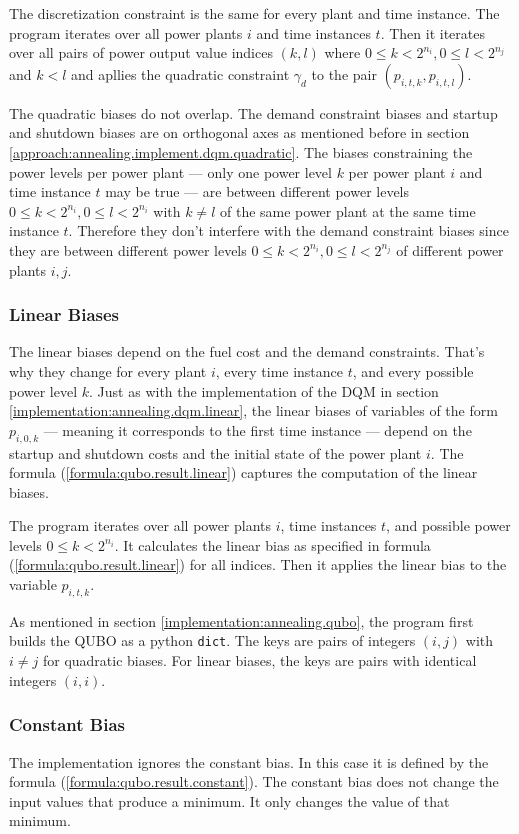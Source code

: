 The discretization constraint is the same for every plant and time instance.
The program iterates over all power plants $i$ and time instances $t$.
Then it iterates over all pairs of power output value indices $(k, l)$ where $0 \leq k < 2^{n_i}, 0 \leq l < 2^{n_j}$ and $k < l$ and apllies the quadratic constraint $\gamma_d$ to the pair $(p_{i, t, k}, p_{i, t, l})$.

The quadratic biases do not overlap.
The demand constraint biases and startup and shutdown biases are on orthogonal axes as mentioned before in section \ref{approach:annealing.implement.dqm.quadratic}.
The biases constraining the power levels per power plant --- only one power level $k$ per power plant $i$ and time instance $t$ may be true
--- are between different power levels $0 \leq k < 2^{n_i}, 0 \leq l < 2^{n_i}$ with $k \neq l$ of the same power plant at the same time instance $t$.
Therefore they don't interfere with the demand constraint biases since they are between different power levels $0 \leq k < 2^{n_i}, 0 \leq l < 2^{n_j}$ of different power plants $i, j$.

\subsubsection{Linear Biases}
\label{implementation:annealing.qubo.linear}

The linear biases depend on the fuel cost and the demand constraints.
That's why they change for every plant $i$, every time instance $t$, and every possible power level $k$.
Just as with the implementation of the DQM in section \ref{implementation:annealing.dqm.linear}, the linear biases of variables of the form $p_{i, 0, k}$
--- meaning it corresponds to the first time instance ---
depend on the startup and shutdown costs and the initial state of the power plant $i$.
The formula (\ref{formula:qubo.result.linear}) captures the computation of the linear biases.

The program iterates over all power plants $i$, time instances $t$, and possible power levels $0 \leq k < 2^{n_i}$.
It calculates the linear bias as specified in formula (\ref{formula:qubo.result.linear}) for all indices.
Then it applies the linear bias to the variable $p_{i, t, k}$.

As mentioned in section \ref{implementation:annealing.qubo}, the program first builds the QUBO as a python \texttt{dict}.
The keys are pairs of integers $(i, j)$ with $i \neq j$ for quadratic biases.
For linear biases, the keys are pairs with identical integers $(i, i)$.

\subsubsection{Constant Bias}
\label{implementation:annealing.qubo.constant}

The implementation ignores the constant bias.
In this case it is defined by the formula (\ref{formula:qubo.result.constant}).
The constant bias does not change the input values that produce a minimum.
It only changes the value of that minimum.
